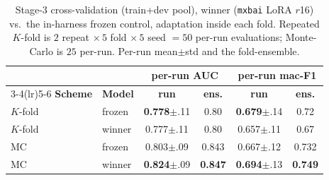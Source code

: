 \begin{table}[t]
\caption{Stage-3 cross-validation (train+dev pool), winner (\texttt{mxbai} LoRA
$r$16) vs.\ the in-harness frozen control, adaptation inside each fold. Repeated
$K$-fold is $2$ repeat $\times\,5$ fold $\times\,5$ seed $=50$ per-run
evaluations; Monte-Carlo is $25$ per-run. Per-run mean$\pm$std and the
fold-ensemble.}
\label{tab:ft-cv}
\centering\small
\setlength{\tabcolsep}{4pt}
\begin{tabular}{@{}llcccc@{}}
\toprule
 & & \multicolumn{2}{c}{\textbf{per-run AUC}} & \multicolumn{2}{c}{\textbf{per-run mac-F1}} \\
\cmidrule(lr){3-4}\cmidrule(lr){5-6}
\textbf{Scheme} & \textbf{Model} & \textbf{run} & \textbf{ens.} & \textbf{run} & \textbf{ens.} \\
\midrule
$K$-fold & frozen        & \textbf{0.778}{\footnotesize$\pm$.11} & 0.80 & \textbf{0.679}{\footnotesize$\pm$.14} & 0.72 \\
$K$-fold & winner        & 0.777{\footnotesize$\pm$.11} & 0.80 & 0.657{\footnotesize$\pm$.11} & 0.67 \\
\midrule
MC       & frozen        & 0.803{\footnotesize$\pm$.09} & 0.843 & 0.667{\footnotesize$\pm$.12} & 0.732 \\
MC       & winner        & \textbf{0.824}{\footnotesize$\pm$.09} & \textbf{0.847} & \textbf{0.694}{\footnotesize$\pm$.13} & \textbf{0.749} \\
\bottomrule
\end{tabular}
\end{table}

